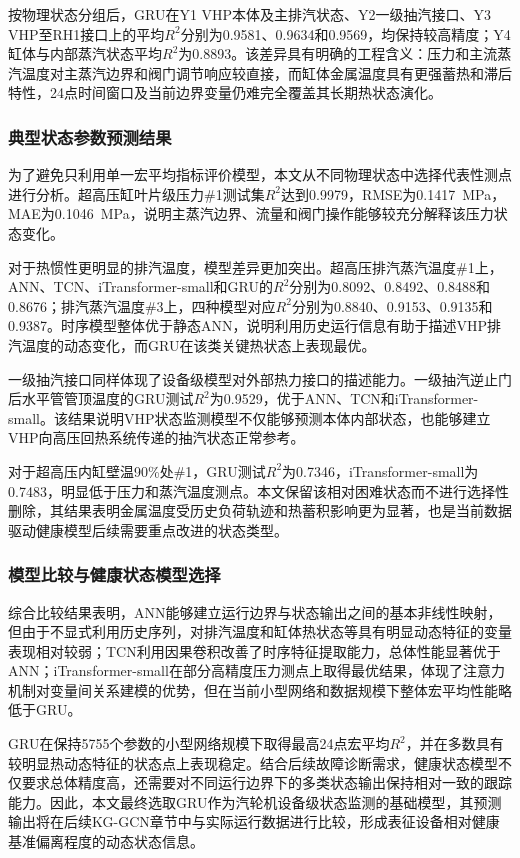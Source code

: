 按物理状态分组后，GRU在Y1 VHP本体及主排汽状态、Y2一级抽汽接口、Y3 VHP至RH1接口上的平均$R^2$分别为0.9581、0.9634和0.9569，均保持较高精度；Y4缸体与内部蒸汽状态平均$R^2$为0.8893。该差异具有明确的工程含义：压力和主流蒸汽温度对主蒸汽边界和阀门调节响应较直接，而缸体金属温度具有更强蓄热和滞后特性，24点时间窗口及当前边界变量仍难完全覆盖其长期热状态演化。

\subsubsection{典型状态参数预测结果}

为了避免只利用单一宏平均指标评价模型，本文从不同物理状态中选择代表性测点进行分析。超高压缸叶片级压力\#1测试集$R^2$达到0.9979，RMSE为0.1417~MPa，MAE为0.1046~MPa，说明主蒸汽边界、流量和阀门操作能够较充分解释该压力状态变化。

对于热惯性更明显的排汽温度，模型差异更加突出。超高压排汽蒸汽温度\#1上，ANN、TCN、iTransformer-small和GRU的$R^2$分别为0.8092、0.8492、0.8488和0.8676；排汽蒸汽温度\#3上，四种模型对应$R^2$分别为0.8840、0.9153、0.9135和0.9387。时序模型整体优于静态ANN，说明利用历史运行信息有助于描述VHP排汽温度的动态变化，而GRU在该类关键热状态上表现最优。

一级抽汽接口同样体现了设备级模型对外部热力接口的描述能力。一级抽汽逆止门后水平管管顶温度的GRU测试$R^2$为0.9529，优于ANN、TCN和iTransformer-small。该结果说明VHP状态监测模型不仅能够预测本体内部状态，也能够建立VHP向高压回热系统传递的抽汽状态正常参考。

对于超高压内缸壁温90\%处\#1，GRU测试$R^2$为0.7346，iTransformer-small为0.7483，明显低于压力和蒸汽温度测点。本文保留该相对困难状态而不进行选择性删除，其结果表明金属温度受历史负荷轨迹和热蓄积影响更为显著，也是当前数据驱动健康模型后续需要重点改进的状态类型。

\subsubsection{模型比较与健康状态模型选择}

综合比较结果表明，ANN能够建立运行边界与状态输出之间的基本非线性映射，但由于不显式利用历史序列，对排汽温度和缸体热状态等具有明显动态特征的变量表现相对较弱；TCN利用因果卷积改善了时序特征提取能力，总体性能显著优于ANN；iTransformer-small在部分高精度压力测点上取得最优结果，体现了注意力机制对变量间关系建模的优势，但在当前小型网络和数据规模下整体宏平均性能略低于GRU。

GRU在保持5755个参数的小型网络规模下取得最高24点宏平均$R^2$，并在多数具有较明显热动态特征的状态点上表现稳定。结合后续故障诊断需求，健康状态模型不仅要求总体精度高，还需要对不同运行边界下的多类状态输出保持相对一致的跟踪能力。因此，本文最终选取GRU作为汽轮机设备级状态监测的基础模型，其预测输出将在后续KG-GCN章节中与实际运行数据进行比较，形成表征设备相对健康基准偏离程度的动态状态信息。

